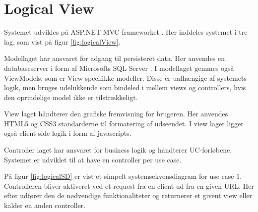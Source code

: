 \section{Logical View}\label{sec:LogicalView}
Systemet udvikles på ASP.NET MVC-frameworket \citep{aspnetmvcWeb}. Her inddeles systemet i tre lag, som vist på figur \ref{fig:logicalView}.


Modellaget har ansvaret for adgang til persisteret data. Her anvendes en databaseserver i form af Microsofts SQL Server \citep{sqlserverWeb}. I modellaget gemmes også ViewModels, som er View-specifikke modeller. Disse er uafhængige af systemets logik, men bruges udelukkende som bindeled i mellem views og controllers, hvis den oprindelige model ikke er tilstrækkeligt.

View laget håndterer den grafiske fremvisning for brugeren. Her anvendes HTML5 og CSS3 standarderne til formatering af udseendet. I view laget ligger også client side logik i form af javascripts.

Controller laget har ansvaret for business logik og håndterer UC-forløbene. Systemet er udviklet til at have en controller per use case.

På figur \ref{fig:logicalSD} er vist et simpelt systemsekvensdiagram for use case 1. Controlleren bliver aktiveret ved et request fra en client ud fra en given URL. Her efter udfører den de nødvendige funktionaliteter og returnerer et givent view eller kalder en anden controller.

